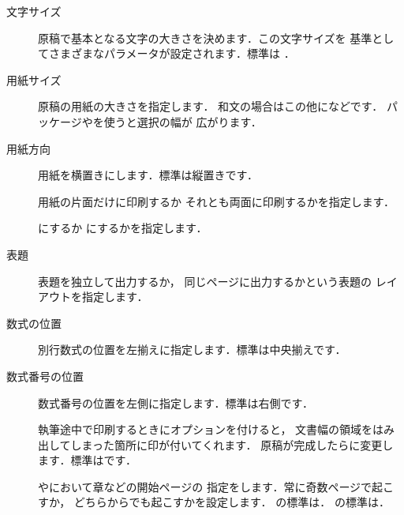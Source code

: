 {\begin{description}
\item[{文字サイズ}\av{\Optionlist{10pt,11pt,12pt}}] 
%
%
原稿で基本となる文字の大きさを決めます．この文字サイズを
基準としてさまざまなパラメータが設定されます．標準は
\option{10pt}．

\item[{用紙サイズ}]
原稿の用紙の大きさを指定します．
%
%
%
和文の場合はこの他になどです．
パッケージやを使うと選択の幅が
広がります．

\item[{用紙方向}]
用紙を横置きにします．標準は縦置きです．

\item[]
用紙の片面だけに印刷するか
それとも両面に印刷するかを指定します．
\item[]
%
にするか
にするかを指定します．

\item[{表題}]
表題を独立して出力するか，
同じページに出力するかという表題の
レイアウトを指定します．

\item[{数式の位置}]
%	   
別行数式の位置を左揃えに指定します．標準は中央揃えです．
	
\item[{数式番号の位置}]
%
数式番号の位置を左側に指定します．標準は右側です．
	
\item[]
%
%
執筆途中で印刷するときにオプションを付けると，
文書幅の領域をはみ出してしまった箇所に印が付いてくれます．
原稿が完成したらに変更します．標準はです．

\item[]
やにおいて章などの開始ページの
指定をします．常に奇数ページで起こすか，
どちらからでも起こすかを設定します．
の標準は．
の標準は．
\end{description}


}
